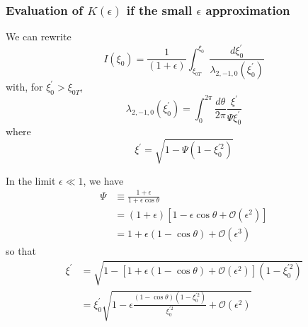 \subsubsection{Evaluation of $K\left(  \epsilon\right)  $ if the small $\epsilon$ approximation}

We can rewrite%
\begin{equation}
I\left(  \xi_{0}\right)  =\frac{1}{\left(  1+\epsilon\right)  }\int_{\xi_{0T}%
}^{\xi_{0}}\frac{d\xi_{0}^{\prime}}{\lambda_{2,-1,0}\left(  \xi_{0}^{\prime
}\right)  }%
\end{equation}
with, for $\xi_{0}^{\prime}>\xi_{0T}$,%
\begin{equation}
\lambda_{2,-1,0}\left(  \xi_{0}^{\prime}\right)  =\int_{0}^{2\pi}\frac
{d\theta}{2\pi}\frac{\xi^{\prime}}{\Psi\xi_{0}^{\prime}}%
\end{equation}
where%
\begin{equation}
\xi^{\prime}=\sqrt{1-\Psi\left(  1-\xi_{0}^{\prime2}\right)  }%
\end{equation}

In the limit $\epsilon\ll1$, we have%
\begin{align}
\Psi &  \equiv\frac{1+\epsilon}{1+\epsilon\cos\theta}\nonumber\\
&  =\left(  1+\epsilon\right)  \left[  1-\epsilon\cos\theta+\mathcal{O}\left(
\epsilon^{2}\right)  \right] \nonumber\\
&  =1+\epsilon\left(  1-\cos\theta\right)  +\mathcal{O}\left(  \epsilon
^{3}\right)
\end{align}
so that%
\begin{align*}
\xi^{\prime}  &  =\sqrt{1-\left[  1+\epsilon\left(  1-\cos\theta\right)
+\mathcal{O}\left(  \epsilon^{2}\right)  \right]  \left(  1-\xi_{0}^{\prime
2}\right)  }\\
&  =\xi_{0}^{\prime}\sqrt{1-\epsilon\frac{\left(  1-\cos\theta\right)  \left(
1-\xi_{0}^{\prime2}\right)  }{\xi_{0}^{\prime2}}+\mathcal{O}\left(
\epsilon^{2}\right)  }%
\end{align*}


